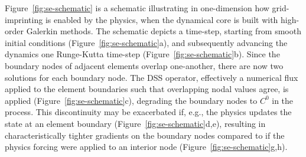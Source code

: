 \documentclass[twocol]{ametsoc}
\begin{document}
{\color{red}Figure~\ref{fig:se-schematic} is a schematic illustrating in one-dimension how grid-imprinting is enabled by the physics, when the dynamical core is built with high-order Galerkin methods. The schematic depicts a time-step, starting from smooth initial conditions (Figure~\ref{fig:se-schematic}a), and subsequently advancing the dynamics one Runge-Kutta time-step (Figure~\ref{fig:se-schematic}b). Since the boundary nodes of adjacent elements overlap one-another, there are now two solutions for each boundary node. The DSS operator, effectively a numerical flux applied to the element boundaries such that overlapping nodal values agree, is applied (Figure~\ref{fig:se-schematic}c),  degrading the boundary nodes to $C^0$ in the process. This discontinuity may be exacerbated if, e.g., the physics updates the state at an element boundary (Figure~\ref{fig:se-schematic}d,e), resulting in characteristically tighter gradients on the boundary nodes compared to if the physics forcing were applied to an interior node (Figure~\ref{fig:se-schematic}g,h).{}}   
\end{document}

